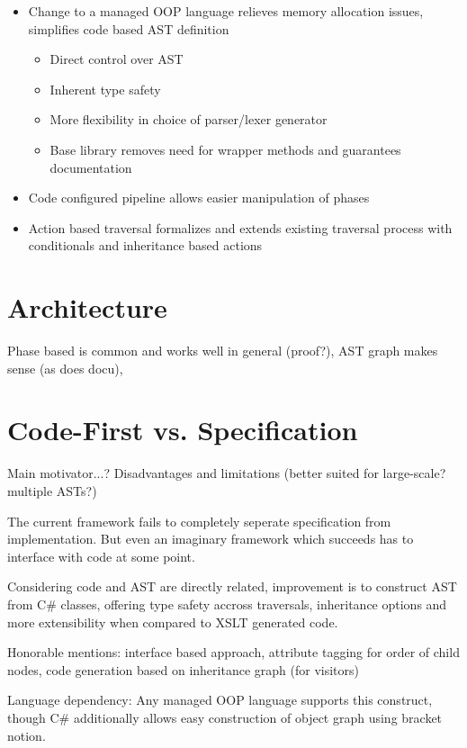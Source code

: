 \documentclass[twoside,openright]{uva-bachelor-thesis}
\begin{document}
		\begin{itemize}
			\item Change to a managed OOP language relieves memory allocation issues, simplifies code based AST definition
			\begin{itemize}
				\item Direct control over AST
				\item Inherent type safety
				\item More flexibility in choice of parser/lexer generator
				\item Base library removes need for wrapper methods and guarantees documentation
			\end{itemize}
			\item Code configured pipeline allows easier manipulation of phases
			\item Action based traversal formalizes and extends existing traversal process with conditionals and inheritance based actions
		\end{itemize}
	
	\section{Architecture}
		Phase based is common and works well in general (proof?), AST graph makes sense (as does docu), 
		
	\section{Code-First vs. Specification}
		Main motivator...? Disadvantages and limitations (better suited for large-scale? multiple ASTs?)
		
		The current framework fails to completely seperate specification from implementation. But even an imaginary framework which succeeds has to interface with code at some point. 
		
		Considering code and AST are directly related, improvement is to construct AST from C\# classes, offering type safety accross traversals, inheritance options and more extensibility when compared to XSLT generated code.
		
		Honorable mentions: interface based approach, attribute tagging for order of child nodes, code generation based on inheritance graph (for visitors)
		
		Language dependency: Any managed OOP language supports this construct, though C\# additionally allows easy construction of object graph using bracket notion.
		
\end{document}
